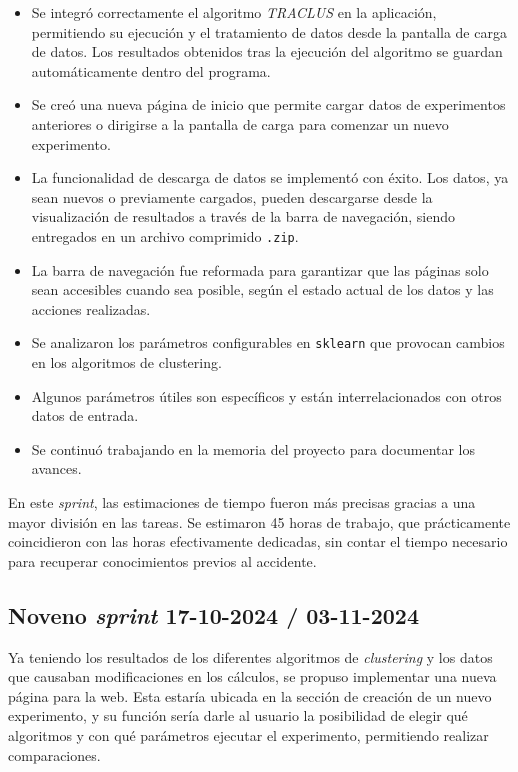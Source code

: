 \begin{itemize}
    \item Se integró correctamente el algoritmo \textit{TRACLUS} en la aplicación, permitiendo su ejecución y el tratamiento de datos desde la pantalla de carga de datos. Los resultados obtenidos tras la ejecución del algoritmo se guardan automáticamente dentro del programa.
    \item Se creó una nueva página de inicio que permite cargar datos de experimentos anteriores o dirigirse a la pantalla de carga para comenzar un nuevo experimento.
    \item La funcionalidad de descarga de datos se implementó con éxito. Los datos, ya sean nuevos o previamente cargados, pueden descargarse desde la visualización de resultados a través de la barra de navegación, siendo entregados en un archivo comprimido \texttt{.zip}.
    \item La barra de navegación fue reformada para garantizar que las páginas solo sean accesibles cuando sea posible, según el estado actual de los datos y las acciones realizadas.
    \item Se analizaron los parámetros configurables en \texttt{sklearn} que provocan cambios en los algoritmos de clustering.
        \item Algunos parámetros útiles son específicos y están interrelacionados con otros datos de entrada.
    \item Se continuó trabajando en la memoria del proyecto para documentar los avances.
\end{itemize}

En este \textit{sprint}, las estimaciones de tiempo fueron más precisas gracias a una mayor división en las tareas. Se estimaron 45 horas de trabajo, que prácticamente coincidieron con las horas efectivamente dedicadas, sin contar el tiempo necesario para recuperar conocimientos previos al accidente.

\subsection{Noveno \textit{sprint} 17-10-2024 / 03-11-2024}

Ya teniendo los resultados de los diferentes algoritmos de \textit{clustering} y los datos que causaban modificaciones en los cálculos, se propuso implementar una nueva página para la web. Esta estaría ubicada en la sección de creación de un nuevo experimento, y su función sería darle al usuario la posibilidad de elegir qué algoritmos y con qué parámetros ejecutar el experimento, permitiendo realizar comparaciones.

